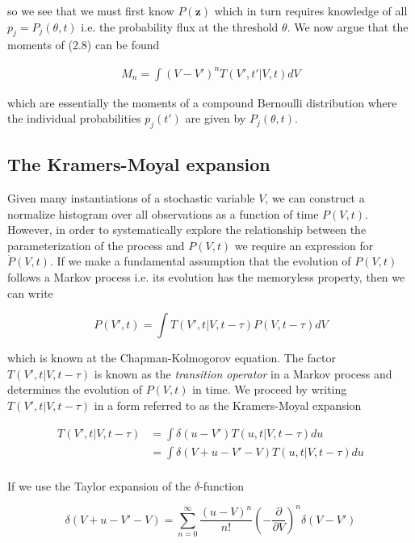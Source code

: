 \documentclass{ucetd}
\begin{document}
so we see that we must first know $P(\mathbf{z})$ which in turn requires knowledge of all $p_{j} = P_{j}(\theta, t)$ i.e. the probability flux at the threshold $\theta$. We now argue that the moments of (2.8) can be found 

\begin{align}
M_{n} = \int (V-V')^{n} T(V',t'|V,t) dV
\end{align}

which are essentially the moments of a compound Bernoulli distribution where the individual probabilities $p_{j}(t')$ are given by $P_{j}(\theta, t)$.


\begin{appendices}
\chapter{The Kramers-Moyal expansion}

Given many instantiations of a stochastic variable $V$, we can construct a normalize histogram over all observations as a function of time $P(V,t)$. However, in order to systematically explore the relationship between the parameterization of the process and $P(V,t)$ we require an expression for $\dot{P}(V,t)$. If we make a fundamental assumption that the evolution of $P(V,t)$ follows a Markov process i.e. its evolution has the memoryless property, then we can write

\begin{equation}
P(V', t) = \int T(V', t | V, t-\tau)P(V, t-\tau)dV
\end{equation} 

which is known at the Chapman-Kolmogorov equation. The factor $T(V', t | V, t-\tau)$ is known as the \emph{transition operator} in a Markov process and determines the evolution of $P(V,t)$ in time. We proceed by writing $T(V', t | V, t-\tau)$ in a form referred to as the Kramers-Moyal expansion

\begin{align*}
T(V', t | V, t-\tau) &= \int \delta(u-V')T(u, t | V, t-\tau)du\\
&= \int \delta(V+u-V'-V)T(u, t | V, t-\tau)du\\
\end{align*} 

If we use the Taylor expansion of the $\delta$-function 

\begin{equation*}
\delta(V+u-V'-V) = \sum_{n=0}^{\infty} \frac{(u-V)^{n}}{n!}\left(-\frac{\partial}{\partial V}\right)^{n}\delta(V-V')
\end{equation*}


\end{appendices}
\end{document}
